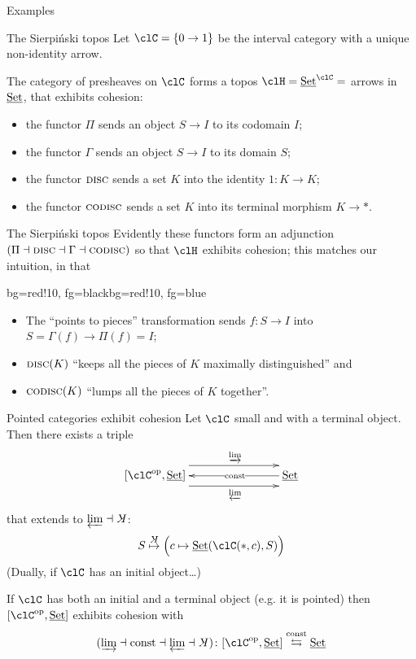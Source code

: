 \documentclass[presentation]{beamer}
\begin{document}
%
%
%
%
%
%
%
%
%
\begin{frame}
	\Huge
	\centering
	Examples
\end{frame}
%
%
%
%
%
%
%
%
%
\begin{frame}{The Sierpiński topos}
	Let $\clC = \{0\to 1\}$ be the interval category with a unique non-identity arrow.
	\onslide<+->

	\medskip

	The category of \alert{presheaves} on $\clC$ forms a topos $\clH=\Set^{\clC} =$ arrows in $\underline{\text{Set}}$, that exhibits cohesion:
	\begin{itemize}
		\item<+-> the functor \alert{$\Pi$} sends an object $S\to I$ to its \alert{codomain} $I$;
		\item<+-> the functor \alert{$\Gamma$} sends an object $S\to I$ to its \alert{domain} $S$;
		\item<+-> the functor \alert{$\textsc{disc}$} sends a set $K$ into the \alert{identity} $1\colon K\to K$;
		\item<+-> the functor \alert{$\textsc{codisc}$} sends a set $K$ into its \alert{terminal} morphism $K\to *$.
  \end{itemize}
\end{frame}
\begin{frame}{The Sierpiński topos}
	Evidently these functors form an adjunction $(\Pi\dashv\textsc{disc}\dashv\Gamma\dashv\textsc{codisc})$ so that $\clH$ exhibits cohesion; this matches our intuition, in that
	\begin{variableblock}{}{bg=red!10, fg=black}{bg=red!10, fg=blue}
		\begin{itemize}
			\item The ``points to pieces'' transformation sends $f : S\to I$ into $S = \Gamma(f) \to \Pi(f)=I$;
			\item $\textsc{disc}(K)$ ``keeps all the pieces of $K$ maximally distinguished'' and
			\item $\textsc{codisc}(K)$ ``lumps all the pieces of $K$ together''.
		\end{itemize}
	\end{variableblock}
\end{frame}
%
%
%
%
%
%
%
%
%
\begin{frame}{Pointed categories exhibit cohesion}
	\def\coconst{\rotatebox[origin=c]{180}{$K$}}
	Let $\clC$ small and with a terminal object. Then there exists a triple
	\[
		\xymatrix@C=2cm{
		**[l] [\clC^\text{op},\Set] \ar@<9pt>[r]^\varinjlim \ar@<-9pt>[r]_\varprojlim & \ar[l]|{\text{const}} \Set
		}
	\]
	that extends to $\varprojlim\dashv \coconst$:
	\[
		S\overset{{\footnotesize\coconst}}\mapsto \Big( c\mapsto \Set(\clC(*,c),S) \Big)
	\]
	\onslide<+->
	(Dually, if $\clC$ has an initial object\dots)%
	\onslide<+->
	\begin{prop}
		If $\clC$ has both an initial and a terminal object (e.g. it is pointed) then $[\clC^\text{op},\Set]$ exhibits cohesion with
		\[
			(\varinjlim \dashv \text{const} \dashv \varprojlim \dashv \coconst) \colon [\clC^\text{op},\Set] \overset{\text{const}}\leftrightarrows \Set
		\]
	\end{prop}
\end{frame}
\end{document}

